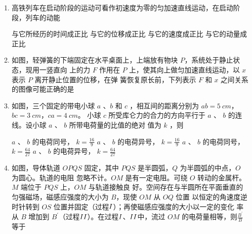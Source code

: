\begin{enumerate}
\renewcommand{\labelenumi}{\arabic{enumi}.}
\item
高铁列车在启动阶段的运动可看作初速度为零的匀加速直线运动，在启动阶段，列车的动能  

\fourchoices
{与它所经历的时间成正比}
{与它的位移成正比}
{与它的速度成正比}
{与它的动量成正比}


\item
如图，轻弹簧的下端固定在水平桌面上，上端放有物块 $ P $，系统处于静止状态，现用一竖直向
上的力 $ F $ 作用在 $ P $ 上，使其向上做匀加速直线运动，以 $ x $ 表示 $ P $ 离开静止位置的位移，在弹
簧恢复原长前，下列表示 $ F $ 和 $ x $ 之间关系的图像可能正确的是  

\begin{figure}[h!]
\centering

\end{figure}




\item
如图，三个固定的带电小球 $ a $ 、$ b $ 和 $ c $ ，相互间的距离分别为 $ ab=5 \ cm $，$ bc=3 \ cm $，$ ca=4 \ cm $。
小球 $ c $ 所受库仑力的合力的方向平行于 $ a $ 、 $ b $ 的连线。设小球 $ a $ 、 $ b $ 所带电荷量的比值的绝对
值为 $ k $ ，则  

\begin{figure}[h!]
\centering

\end{figure}

\fourchoices
{$ a $ 、 $ b $ 的电荷同号， $k=\frac{16}{9}$}
{$ a $ 、 $ b $ 的电荷异号， $k=\frac{16}{9}$}
{$ a $ 、 $ b $ 的电荷同号， $k=\frac{64}{27}$}
{$ a $ 、 $ b $ 的电荷异号， $k=\frac{64}{27}$}



\banswer{

}

\item
如图，导体轨道 $ OPQS $ 固定，其中 $ PQS $ 是半圆弧，$ Q $ 为半圆弧的中点，$ O $ 为圆心。轨道的电阻
忽略不计。$ OM $ 是有一定电阻。可绕 $ O $ 转动的金属杆。$ M $ 端位于 $ PQS $ 上，$ OM $ 与轨道接触良
好。空间存在与半圆所在平面垂直的匀强磁场，磁感应强度的大小为 $ B $，现使 $ OM $ 从 $ OQ $ 位置
以恒定的角速度逆时针转到 $ OS $ 位置并固定（过程$ \lmd{1} $）；再使磁感应强度的大小以一定的变化
率从 $ B $ 增加到 $ B ^{\prime} $（过程$ \lmd{2} $）。在过程$ \lmd{1} $、$ \lmd{2} $中，流过 $ OM $ 的电荷量相等，则$\frac{B^{\prime}}{B}$等于  


\end{enumerate}
